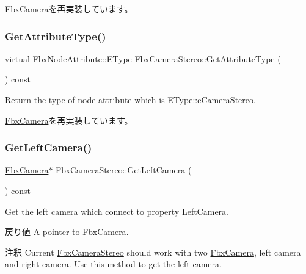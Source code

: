 \hyperlink{class_fbx_camera_a11334e5358efacbd87e4a7d78036155d}{Fbx\+Camera}を再実装しています。

\mbox{\label{class_fbx_camera_stereo_a19160f0fdeaf5407d2bc9c1608f6af53}} 
\subsubsection{\texorpdfstring{Get\+Attribute\+Type()}{GetAttributeType()}}
{\footnotesize\ttfamily virtual \hyperlink{class_fbx_node_attribute_a08e1669d3d1a696910756ab17de56d6a}{Fbx\+Node\+Attribute\+::\+E\+Type} Fbx\+Camera\+Stereo\+::\+Get\+Attribute\+Type (\begin{DoxyParamCaption}{ }\end{DoxyParamCaption}) const\hspace{0.3cm}{\ttfamily [virtual]}}



Return the type of node attribute which is E\+Type\+::e\+Camera\+Stereo. 



\hyperlink{class_fbx_camera_a1149e4b05fd079637fe8d2a66a5a7a17}{Fbx\+Camera}を再実装しています。

\mbox{\label{class_fbx_camera_stereo_a6841f71c09bdd63c7e936cdb23e818e9}} 
\subsubsection{\texorpdfstring{Get\+Left\+Camera()}{GetLeftCamera()}}
{\footnotesize\ttfamily \hyperlink{class_fbx_camera}{Fbx\+Camera}$\ast$ Fbx\+Camera\+Stereo\+::\+Get\+Left\+Camera (\begin{DoxyParamCaption}{ }\end{DoxyParamCaption}) const}

Get the left camera which connect to property Left\+Camera. \begin{DoxyReturn}{戻り値}
A pointer to \hyperlink{class_fbx_camera}{Fbx\+Camera}. 
\end{DoxyReturn}
\begin{DoxyRemark}{注釈}
Current \hyperlink{class_fbx_camera_stereo}{Fbx\+Camera\+Stereo} should work with two \hyperlink{class_fbx_camera}{Fbx\+Camera}, left camera and right camera. Use this method to get the left camera. 
\end{DoxyRemark}
\mbox{\label{class_fbx_camera_stereo_afca8a70331c5a524ad7c790e8c52af77}} 
